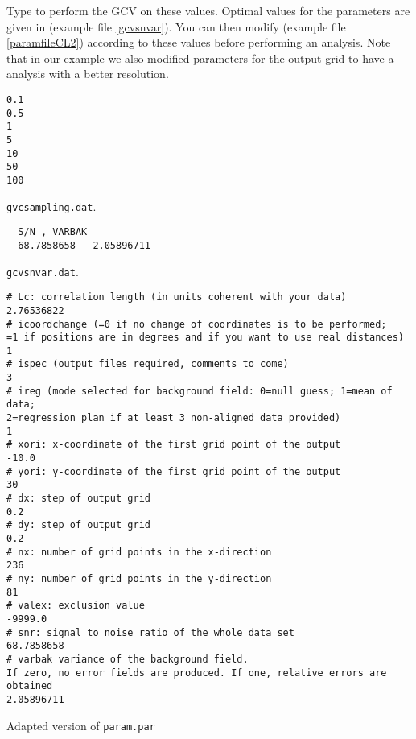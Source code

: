 Type  to perform the GCV on these values. Optimal values for the parameters are given in  (example file \ref{gcvsnvar}). You can then modify  (example file \ref{paramfileCL2}) according to these values before performing an analysis. Note that in our example we also modified parameters for the output grid to have a analysis with a better resolution.


\begin{exfile}[H]
\begin{footnotesize}
\begin{verbatim}
0.1
0.5
1
5
10
50
100
\end{verbatim}
\end{footnotesize}
\caption{\texttt{gvcsampling.dat}. \label{gcvsampling}}
\end{exfile}


\begin{exfile}[H]
\begin{footnotesize}
\begin{verbatim}
  S/N , VARBAK
  68.7858658   2.05896711
\end{verbatim}
\end{footnotesize}
\caption{\texttt{gcvsnvar.dat}. \label{gcvsnvar}}
\end{exfile}



\begin{exfile}[htpb]
\begin{footnotesize}
\begin{verbatim}
# Lc: correlation length (in units coherent with your data)
2.76536822
# icoordchange (=0 if no change of coordinates is to be performed; 
=1 if positions are in degrees and if you want to use real distances)
1
# ispec (output files required, comments to come)
3
# ireg (mode selected for background field: 0=null guess; 1=mean of data; 
2=regression plan if at least 3 non-aligned data provided)
1
# xori: x-coordinate of the first grid point of the output
-10.0
# yori: y-coordinate of the first grid point of the output
30
# dx: step of output grid
0.2
# dy: step of output grid
0.2
# nx: number of grid points in the x-direction
236
# ny: number of grid points in the y-direction
81
# valex: exclusion value
-9999.0
# snr: signal to noise ratio of the whole data set
68.7858658   
# varbak variance of the background field. 
If zero, no error fields are produced. If one, relative errors are obtained
2.05896711
\end{verbatim}
\end{footnotesize}
\caption{Adapted version of \texttt{param.par}\label{paramfileCL2}}
\end{exfile}

